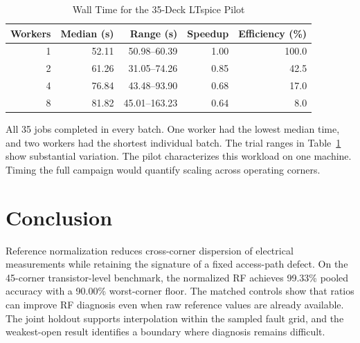 \documentclass[conference,letterpaper]{IEEEtran}
\begin{document}
\begin{table}[!t]
\caption{Wall Time for the 35-Deck LTspice Pilot}
\label{tab:batch-timing}
\centering
\footnotesize
\setlength{\tabcolsep}{4pt}
\begin{tabular}{@{}rrrrr@{}}
\toprule
Workers & Median (s) & Range (s) & Speedup & Efficiency (\%) \\
\midrule
1 & 52.11 & 50.98--60.39 & 1.00 & 100.0 \\
2 & 61.26 & 31.05--74.26 & 0.85 & 42.5 \\
4 & 76.84 & 43.48--93.90 & 0.68 & 17.0 \\
8 & 81.82 & 45.01--163.23 & 0.64 & 8.0 \\
\bottomrule
\end{tabular}
\end{table}

All 35 jobs completed in every batch. One worker had the lowest median time, and two workers had the shortest individual batch. The trial ranges in Table~\ref{tab:batch-timing} show substantial variation. The pilot characterizes this workload on one machine. Timing the full campaign would quantify scaling across operating corners.

\section{Conclusion}

Reference normalization reduces cross-corner dispersion of electrical measurements while retaining the signature of a fixed access-path defect. On the 45-corner transistor-level benchmark, the normalized RF achieves 99.33\% pooled accuracy with a 90.00\% worst-corner floor. The matched controls show that ratios can improve RF diagnosis even when raw reference values are already available. The joint holdout supports interpolation within the sampled fault grid, and the weakest-open result identifies a boundary where diagnosis remains difficult.
\end{document}

